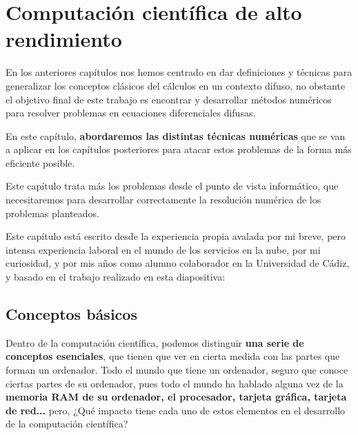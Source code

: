 \chapter{Computación científica de alto rendimiento}
En los anteriores capítulos nos hemos centrado en dar definiciones y técnicas para generalizar los conceptos clásicos del cálculos en un contexto difuso, no obstante el objetivo final de este trabajo es encontrar y desarrollar métodos numéricos para resolver problemas en ecuaciones diferenciales difusas.

En este capítulo, \textbf{abordaremos las distintas técnicas numéricas} que se van a aplicar en los capítulos posteriores para atacar estos problemas de la forma más eficiente posible. 

Este capítulo trata más los problemas desde el punto de vista informático, que necesitaremos para desarrollar correctamente la resolución numérica de los problemas planteados.

Este capítulo está escrito desde la experiencia propia avalada por mi breve, pero intensa experiencia laboral en el mundo de los servicios en la nube, por mi curiosidad, y por mis años como alumno colaborador en la Universidad de Cádiz, y basado en el trabajo realizado en esta diapositiva: \cite{paralelo}

\section{Conceptos básicos}
Dentro de la computación científica, podemos distinguir \textbf{una serie de conceptos esenciales}, que tienen que ver en cierta medida con las partes que forman un ordenador. Todo el mundo que tiene un ordenador, seguro que conoce ciertas partes de su ordenador, pues todo el mundo ha hablado alguna vez de la \textbf{memoria RAM de su ordenador, el procesador, tarjeta gráfica, tarjeta de red...} pero, ¿Qué impacto tiene cada uno de estos elementos en el desarrollo de la computación científica?

